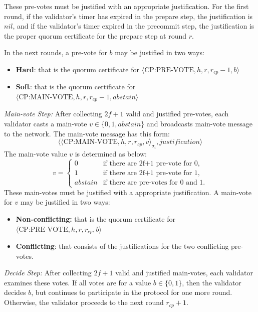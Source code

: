 \documentclass{novel}
\begin{document}
These pre-votes must be justified with an appropriate justification. For the first round, if the validator’s timer has expired in the prepare step, the justification is $nil$, and if the validator’s timer expired in the precommit step, the justification is the proper quorum certificate for the prepare step at round $r$.

In the next rounds, a pre-vote for $b$ may be justified in two ways:
\begin{itemize}
  \item \textbf{Hard}: that is the quorum certificate for $\langle \text{CP:PRE-VOTE},h,r,r_{cp}-1,b \rangle$
  \item \textbf{Soft}: that is the quorum certificate for $\langle \text{CP:MAIN-VOTE},h,r,r_{cp}-1,abstain \rangle$
\end{itemize}

\noindent \emph{Main-vote Step:} After collecting $2f+1$ valid and justified pre-votes, each validator casts a main-vote $v \in \{0, 1, abstain\}$ and broadcasts main-vote message to the network. The main-vote message has this form:
\begin{equation*}
  \langle\langle \text{CP:MAIN-VOTE},h,r,r_{cp},v \rangle_{\sigma_i}, justification\rangle
\end{equation*}
The main-vote value $v$ is determined as below:
\begin{equation*}
  v = \begin{cases}
    0 & \text{if there are 2f+1 pre-vote for 0,} \\
    1 & \text{if there are 2f+1 pre-vote for 1,} \\
    abstain & \text{if there are pre-votes for 0 and 1.}
    \end{cases}
\end{equation*}
These main-votes must be justified with a appropriate justification. A main-vote for $v$ may be justified in two ways:
\begin{itemize}
  \item \textbf{Non-conflicting:} that is the quorum certificate for $\langle \text{CP:PRE-VOTE},h,r,r_{cp},b \rangle$
  \item \textbf{Conflicting}: that consists of the justifications for the two conflicting pre-votes.
\end{itemize}
\noindent \emph{Decide Step:} After collecting $2f+1$ valid and justified main-votes, each validator examines these votes. If all votes are for a value $b \in \{0, 1\}$, then the validator decides $b$, but continues to participate in the protocol for one more round. Otherwise, the validator proceeds to the next round $r_{cp}+1$.
\end{document}
